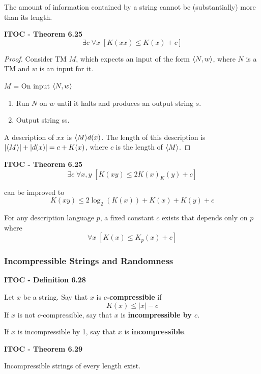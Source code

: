The amount of information contained by a string cannot be (substantially) more than its length.

\begin{shaded}
\textbf{ITOC - Theorem 6.25}
\[
\exists c \; \forall x \;  [K(xx) \leq K(x) + c]
\]
\end{shaded}

\begin{mdframed}
\begin{proof}
Consider TM $M$, which expects an input of the form $\langle{N, w}\rangle$, where $N$ is a TM and $w$ is an input for it.

$M$ = On input $\langle{N, w}\rangle$
\begin{enumerate}
\item Run $N$ on $w$ until it halts and produces an output string $s$.
\item Output string ss.
\end{enumerate}

A description of $xx$ is $\langle{M}\rangle d(x)$. The length of this description is $|\langle{M}\rangle| + |d(x)| = c + K(x)$, where $c$ is the length of $\langle{M}\rangle$.
\end{proof}
\end{mdframed}

\begin{shaded}
\textbf{ITOC - Theorem 6.25}
\[
\exists c \; \forall x,y \;  [K(xy) \leq 2K(x) _ K(y) + c]
\]

can be improved to
\[
K(xy) \leq 2\log_2(K(x)) + K(x) + K(y) + c
\]
\end{shaded}

\begin{shaded}
For any description language $p$, a fixed constant $c$ exists that depends only on $p$ where
\[
\forall x \; [K(x) \leq K_p(x) + c]
\]
\end{shaded}

\subsubsection{Incompressible Strings and Randomness}

\begin{shaded}
\textbf{ITOC - Definition 6.28}

\medskip
Let $x$ be a string. Say that $x$ is \textbf{$c$-compressible} if
\[
K(x) \leq |x| - c
\]
If $x$ is not $c$-compressible, say that $x$ is \textbf{incompressible  by $c$}.

If $x$ is incompressible by 1, say that $x$ is \textbf{incompressible}.
\end{shaded}

\begin{shaded}
\textbf{ITOC - Theorem 6.29}

\medskip
Incompressible strings of every length exist.
\end{shaded}